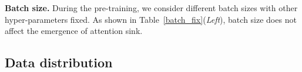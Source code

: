 \textbf{Batch size.} During the pre-training, we consider different batch sizes with other hyper-parameters fixed. As shown in Table~\ref{batch_fix}(\emph{Left}), batch size does not affect the emergence of attention sink.





\subsection{Data distribution} 

